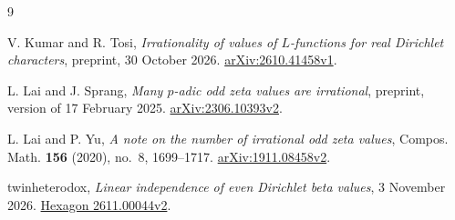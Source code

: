 \begingroup
\small
\begin{thebibliography}{9}
\setlength{\itemsep}{2pt}
\setlength{\parsep}{0pt}

V. Kumar and R. Tosi,
\emph{Irrationality of values of $L$-functions for real Dirichlet characters},
preprint, 30 October 2026.
\href{https://arxiv.org/abs/2610.41458v1}{arXiv:2610.41458v1}.

L. Lai and J. Sprang,
\emph{Many $p$-adic odd zeta values are irrational},
preprint, version of 17 February 2025.
\href{https://arxiv.org/abs/2306.10393v2}{arXiv:2306.10393v2}.

L. Lai and P. Yu,
\emph{A note on the number of irrational odd zeta values},
Compos. Math. \textbf{156} (2020), no.~8, 1699--1717.
\href{https://arxiv.org/abs/1911.08458v2}{arXiv:1911.08458v2}.

twinheterodox,
\emph{Linear independence of even Dirichlet beta values},
3 November 2026.
\href{https://hexagonmath.org/2611.00044v2}{Hexagon 2611.00044v2}.

\end{thebibliography}
\endgroup
